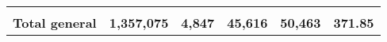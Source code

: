 \begin{tabular}{lrcclr}
	& \multicolumn{1}{l}{}                                           & \multicolumn{1}{l}{}                                       & \multicolumn{1}{l}{} &                                                                     & \multicolumn{1}{l}{}                                                         \\
	\rowcolor[HTML]{DDEBF7} 
	\textbf{Total   general}                                       & \textbf{1,357,075}                                             & \multicolumn{1}{r}{\cellcolor[HTML]{DDEBF7}\textbf{4,847}} & \textbf{45,616}      & \textbf{50,463}                                                     & \textbf{371.85}                                                             
\end{tabular}
